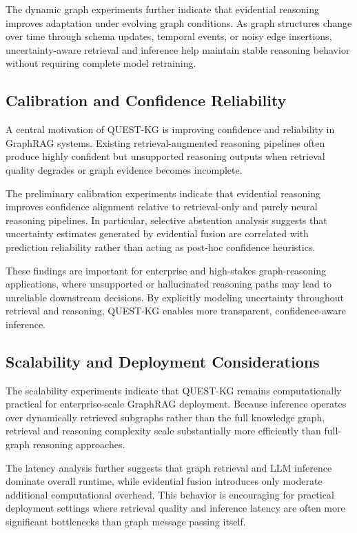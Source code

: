 \documentclass[sigconf,review,anonymous]{acmart}
\begin{document}
The dynamic graph experiments further indicate that evidential reasoning improves adaptation under evolving graph conditions. As graph structures change over time through schema updates, temporal events, or noisy edge insertions, uncertainty-aware retrieval and inference help maintain stable reasoning behavior without requiring complete model retraining.

\subsection{Calibration and Confidence Reliability}

A central motivation of QUEST-KG is improving confidence and reliability in GraphRAG systems. Existing retrieval-augmented reasoning pipelines often produce highly confident but unsupported reasoning outputs when retrieval quality degrades or graph evidence becomes incomplete.

The preliminary calibration experiments indicate that evidential reasoning improves confidence alignment relative to retrieval-only and purely neural reasoning pipelines. In particular, selective abstention analysis suggests that uncertainty estimates generated by evidential fusion are correlated with prediction reliability rather than acting as post-hoc confidence heuristics.

These findings are important for enterprise and high-stakes graph-reasoning applications, where unsupported or hallucinated reasoning paths may lead to unreliable downstream decisions. By explicitly modeling uncertainty throughout retrieval and reasoning, QUEST-KG enables more transparent, confidence-aware inference.

\subsection{Scalability and Deployment Considerations}

The scalability experiments indicate that QUEST-KG remains computationally practical for enterprise-scale GraphRAG deployment. Because inference operates over dynamically retrieved subgraphs rather than the full knowledge graph, retrieval and reasoning complexity scale substantially more efficiently than full-graph reasoning approaches.

The latency analysis further suggests that graph retrieval and LLM inference dominate overall runtime, while evidential fusion introduces only moderate additional computational overhead. This behavior is encouraging for practical deployment settings where retrieval quality and inference latency are often more significant bottlenecks than graph message passing itself.
\end{document}

